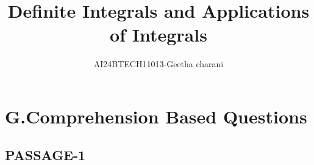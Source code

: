 \documentclass[journal,12pt,twocolumn]{IEEEtran}
\theoremstyle{remark}
\begin{document}

\vspace{3cm}

\title{Definite Integrals and Applications of Integrals}
\author{AI24BTECH11013-Geetha charani}
\maketitle
\newpage
\bigskip

\renewcommand{\thefigure}{\theenumi}
\renewcommand{\thetable}{\theenumi}
\section{G.Comprehension Based Questions}
\subsection{PASSAGE-1}
\end{document}
